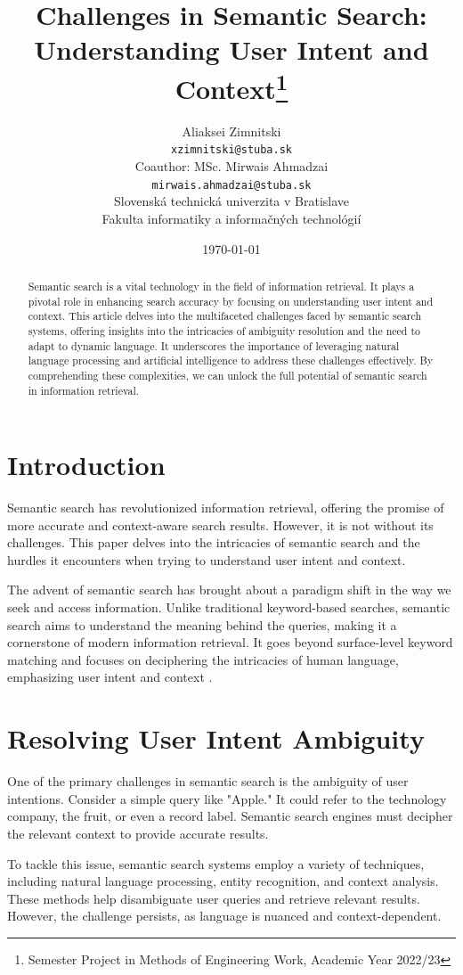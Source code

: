 \documentclass[10pt,oneside,a4paper]{article}
\title{Challenges in Semantic Search: Understanding User Intent and Context\thanks{Semester Project in Methods of Engineering Work, Academic Year 2022/23}}
\author{Aliaksei Zimnitski \\[2pt]
{\small \texttt{xzimnitski@stuba.sk}}\\
Coauthor: MSc. Mirwais Ahmadzai \\[2pt]
{\small \texttt{mirwais.ahmadzai@stuba.sk}}\\
{\small Slovenská technická univerzita v Bratislave}\\
{\small Fakulta informatiky a informačných technológií}\\
}
\date{\small \today}
\begin{document}
\maketitle

\begin{abstract}
Semantic search is a vital technology in the field of information retrieval. It plays a pivotal role in enhancing search accuracy by focusing on understanding user intent and context. This article delves into the multifaceted challenges faced by semantic search systems, offering insights into the intricacies of ambiguity resolution and the need to adapt to dynamic language. It underscores the importance of leveraging natural language processing and artificial intelligence to address these challenges effectively. By comprehending these complexities, we can unlock the full potential of semantic search in information retrieval.
\end{abstract}

\section{Introduction}
Semantic search has revolutionized information retrieval, offering the promise of more accurate and context-aware search results. However, it is not without its challenges. This paper delves into the intricacies of semantic search and the hurdles it encounters when trying to understand user intent and context.

The advent of semantic search has brought about a paradigm shift in the way we seek and access information. Unlike traditional keyword-based searches, semantic search aims to understand the meaning behind the queries, making it a cornerstone of modern information retrieval. It goes beyond surface-level keyword matching and focuses on deciphering the intricacies of human language, emphasizing user intent and context \cite{BaezaYates1999} \cite{Manning2008}.

\section{Resolving User Intent Ambiguity}
One of the primary challenges in semantic search is the ambiguity of user intentions. Consider a simple query like "Apple." It could refer to the technology company, the fruit, or even a record label. Semantic search engines must decipher the relevant context to provide accurate results.

To tackle this issue, semantic search systems employ a variety of techniques, including natural language processing, entity recognition, and context analysis. These methods help disambiguate user queries and retrieve relevant results. However, the challenge persists, as language is nuanced and context-dependent.
\end{document}
